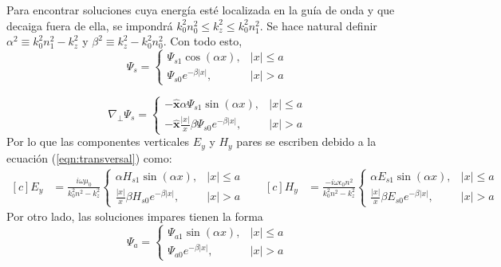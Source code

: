 Para encontrar soluciones cuya energía esté localizada en la guía de onda y que decaiga fuera de ella, se impondrá $k_0^2n_0^2 \le k_z^2 \le k_0^2n_1^2$. Se hace natural definir $\alpha^2\equiv k_0^2n_1^2-k_z^2$ y $\beta^2\equiv k_z^2 - k_0^2n_0^2$. Con todo esto, 
\begin{equation*}
	\Psi_s = \left\{\begin{matrix}
	\Psi_{s1}\cos(\alpha x), & |x|\le a
	\\
	\Psi_{s0}e^{-\beta|x|}, & |x|>a
	\end{matrix}\right.
\end{equation*}

\begin{equation*}
	\nabla_\perp \Psi_s = \left\{\begin{matrix}
	-\hat{\textbf{x}}\alpha\Psi_{s1}\sin(\alpha x), & |x|\le a
	\\
	-\hat{\textbf{x}}\frac{|x|}{x}\beta\Psi_{s0}e^{-\beta|x|}, & |x|>a
	\end{matrix}\right.
\end{equation*}
Por lo que las componentes verticales $E_y$ y $H_y$ pares se escriben debido a la ecuación (\ref{eqn:transversal}) como:
\begin{equation*}
	\begin{aligned}[c]
	 E_y &= \frac{i \omega\mu_0}{k_0^2n^2-k_z^2} \left\{\begin{matrix}
	 \alpha H_{s1}\sin(\alpha x),	 & |x|\le a
	 \\
	 \frac{|x|}{x}\beta H_{s0}e^{-\beta|x|}, & |x|>a
	 \end{matrix}\right.
\end{aligned} 
\quad
	\begin{aligned}[c]
	 H_y &= \frac{-i\omega \epsilon_0 n^2}{k_0^2n^2-k_z^2} \left\{\begin{matrix}
	 \alpha E_{s1}\sin(\alpha x),	& |x|\le a
	 \\
	 \frac{|x|}{x}\beta E_{s0}e^{-\beta|x|}, & |x|>a
	 \end{matrix}\right.
\end{aligned} 
\end{equation*}
Por otro lado, las soluciones impares tienen la forma
\begin{equation*}
	\Psi_a = \left\{\begin{matrix}
	\Psi_{a1}\sin(\alpha x), & |x|\le a
	\\
	\Psi_{a0}e^{-\beta|x|}, & |x|>a
	\end{matrix}\right.
\end{equation*}
